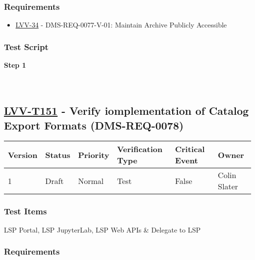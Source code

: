 \hypertarget{requirements-127}{%
\subsubsection{Requirements}\label{requirements-127}}

\begin{itemize}
\tightlist
\item
  \href{https://jira.lsstcorp.org/browse/LVV-34}{LVV-34} -
  DMS-REQ-0077-V-01: Maintain Archive Publicly Accessible
\end{itemize}

\hypertarget{test-script-127}{%
\subsubsection{Test Script}\label{test-script-127}}

\textbf{Step 1}\\
~\\
~\\

\hypertarget{lvv-t151---verify-iomplementation-of-catalog-export-formats-dms-req-0078}{%
\subsection{\texorpdfstring{\href{https://jira.lsstcorp.org/secure/Tests.jspa\#/testCase/LVV-T151}{LVV-T151}
- Verify iomplementation of Catalog Export Formats
(DMS-REQ-0078)}{LVV-T151 - Verify iomplementation of Catalog Export Formats (DMS-REQ-0078)}}\label{lvv-t151---verify-iomplementation-of-catalog-export-formats-dms-req-0078}}

\begin{longtable}[]{@{}llllll@{}}
\toprule
Version & Status & Priority & Verification Type & Critical Event &
Owner\tabularnewline
\midrule
\endhead
1 & Draft & Normal & Test & False & Colin Slater\tabularnewline
\bottomrule
\end{longtable}

\hypertarget{test-items-127}{%
\subsubsection{Test Items}\label{test-items-127}}

LSP Portal, LSP JupyterLab, LSP Web APIs \& Delegate to LSP

\hypertarget{requirements-128}{%
\subsubsection{Requirements}\label{requirements-128}}

